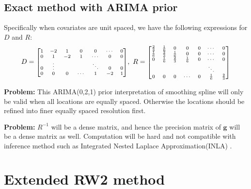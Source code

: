 \documentclass{beamer} %
\begin{document}
\subsection{Exact method with ARIMA prior}
\begin{frame}
Specifically when covariates are unit spaced, we have the following expressions for $D$ and $R$:
\pause
\begin{equation}
\begin{aligned}
D = \mbox{\scriptsize $\begin{bmatrix}
1 & -2 & 1 & 0 & 0 & \cdots & 0\\
0 & 1 & -2 & 1 & \cdots & 0 & 0\\
0 & \vdots &  &  & \ddots & 0 & 0\\
0 & 0 & 0 & \cdots & 1 & -2 & 1\\
\end{bmatrix}$}, \ 
R = \mbox{\scriptsize $\begin{bmatrix}
\frac{2}{3} & \frac{1}{6} & 0 & 0 & 0 & \cdots & 0\\
\frac{1}{6} & \frac{2}{3} & \frac{1}{6} & 0 & 0 & \cdots & 0\\
0 & \frac{1}{6} & \frac{2}{3} & \frac{1}{6} & 0 & \cdots & 0\\
 &  &  &  &  & \ddots & \\
0 & 0 & 0 & \cdots & 0 & \frac{1}{6} & \frac{2}{3}\\
\end{bmatrix}$}
\end{aligned}
\end{equation}

\pause

\textbf{Problem:} This ARIMA(0,2,1) prior interpretation of smoothing spline will only be valid when all locations are equally spaced. Otherwise the locations should be refined into finer equally spaced resolution first.

\pause

\textbf{Problem:} $R^{-1}$ will be a dense matrix, and hence the precision matrix of $\boldsymbol{g}$ will be a dense matrix as well. Computation will be hard and not compatible with inference method such as Integrated Nested Laplace Approximation(INLA) \citep{inla}.



\end{frame}

\section{Extended RW2 method}
\end{document}
